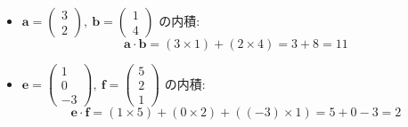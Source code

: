 \begin{ex}
\begin{itemize}
\item $\bm{a} = \begin{pmatrix} 3 \\ 2 \end{pmatrix},\ \bm{b} = \begin{pmatrix} 1 \\ 4 \end{pmatrix}$ の内積:
    \[\bm{a} \cdot \bm{b} = (3 \times 1) + (2 \times 4) = 3 + 8 = 11\]

\item $\bm{e} = \begin{pmatrix} 1 \\ 0 \\ -3 \end{pmatrix},\ \bm{f} = \begin{pmatrix} 5 \\ 2 \\ 1 \end{pmatrix}$ の内積:
    \[\bm{e} \cdot \bm{f} = (1 \times 5) + (0 \times 2) + ((-3) \times 1) = 5 + 0 - 3 = 2\]
\end{itemize}
\end{ex}

